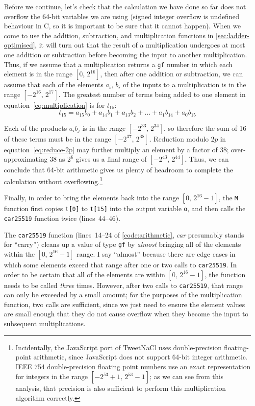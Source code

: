 \documentclass{article}
\begin{document}
Before we continue, let's check that the calculation we have done so far does not overflow the 64-bit variables we are using (signed integer overflow is undefined behaviour in C, so it is important to be sure that it cannot happen).
When we come to use the addition, subtraction, and multiplication functions in \autoref{sec:ladder-optimised}, it will turn out that the result of a multiplication undergoes at most one addition or subtraction before becoming the input to another multiplication.
Thus, if we assume that a multiplication returns a \verb|gf| number in which each element is in the range $[0,\, 2^{16}]$, then after one addition or subtraction, we can assume that each of the elements $a_i$, $b_i$ of the inputs to a multiplication is in the range $[-2^{16},\, 2^{17}]$.
The greatest number of terms being added to one element in equation~\eqref{eq:multiplication} is for $t_{15}$:
\[ t_{15} = a_{15} b_0 + a_{14} b_1 + a_{13} b_2 + \dots + a_1 b_{14} + a_0 b_{15} \]

Each of the products $a_i b_j$ is in the range $[-2^{33},\, 2^{34}]$, so therefore the sum of 16 of these terms must be in the range $[-2^{37},\, 2^{38}]$.
Reduction modulo $2p$ in equation~\eqref{eq:reduce-2p} may further multiply an element by a factor of 38; over-approximating 38 as $2^6$ gives us a final range of $[-2^{43},\, 2^{44}]$.
Thus, we can conclude that 64-bit arithmetic gives us plenty of headroom to complete the calculation without overflowing.\footnote{Incidentally, the JavaScript port of TweetNaCl uses double-precision floating-point arithmetic, since JavaScript does not support 64-bit integer arithmetic.
IEEE 754 double-precision floating point numbers use an exact representation for integers in the range $[-2^{53}+1,\, 2^{53}-1]$; as we can see from this analysis, that precision is also sufficient to perform this multiplication algorithm correctly.}

Finally, in order to bring the elements back into the range $[0,\, 2^{16}-1]$, the \verb|M| function first copies \verb|t[0]| to \verb|t[15]| into the output variable \verb|o|, and then calls the \verb|car25519| function twice (lines~44--46).

The \verb|car25519| function (lines~14--24 of \autoref{code:arithmetic}, \emph{car} presumably stands for ``carry'') cleans up a value of type \verb|gf| by \emph{almost} bringing all of the elements within the $[0,\, 2^{16}-1]$ range.
I say ``almost'' because there are edge cases in which some elements exceed that range after one or two calls to \verb|car25519|.
In order to be certain that all of the elements are within $[0,\, 2^{16}-1]$, the function needs to be called \emph{three} times.
However, after two calls to \verb|car25519|, that range can only be exceeded by a small amount; for the purposes of the multiplication function, two calls are sufficient, since we just need to ensure the element values are small enough that they do not cause overflow when they become the input to subsequent multiplications.
\end{document}
